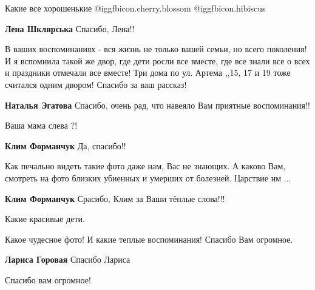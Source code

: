  
 
 
 
 

Какие все хорошенькие  @igg{fbicon.cherry.blossom}  @igg{fbicon.hibiscus} 🌼

\textbf{Лена Шклярська} Спасибо, Лена!!


В ваших воспоминаниях - вся жизнь не только вашей семьи, но всего поколения! И
я вспомнила такой же двор, где дети росли все вместе, где все знали все о всех
и праздники отмечали все вместе! Три дома по ул. Артема ,,15, 17 и 19 тоже
считался одним двором! Спасибо за ваш рассказ!

\textbf{Наталья Эгатова} Спасибо, очень рад, что навеяло Вам приятные воспоминания!!

Ваша мама слева ?!

\textbf{Клим Форманчук} Да, спасибо!!


Как печально видеть такие фото даже нам, Вас не знающих. А каково Вам, смотреть
на фото близких убиенных и умерших от болезней. Царствие им ...

\textbf{Клим Форманчук} Срасибо, Клим за Ваши тёплые слова!!!

Какие красивые дети.

Какое чудесное фото! И какие теплые воспоминания! Спасибо Вам огромное.

\textbf{Лариса Горовая} Спасибо Лариса

Спасибо вам огромное!
